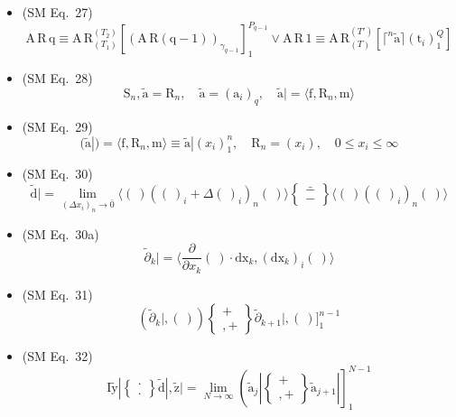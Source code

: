 \documentclass[12pt]{article}
\begin{document}
\begin{itemize}[label={},leftmargin=0pt]
    \item (SM Eq.\ 27) 
    \[
    \mathrm{A}\,\mathrm{R}\,\mathrm{q} \equiv \mathrm{A}\,\mathrm{R}_{(T_1)}^{(T_2)} \left[ (\mathrm{A}\,\mathrm{R}(\mathrm{q}-1))_{\gamma_{q-1}} \right]_1^{P_{q-1}} \lor \mathrm{A}\,\mathrm{R}\,1 \equiv \mathrm{A}\,\mathrm{R}_{(T)}^{(T')} \left[ \lceil^n \tilde{\mathrm{a}} \rceil (\mathrm{t}_i)_1^Q \right]
    \]

    \item (SM Eq.\ 28) 
    \[
    \mathrm{S}_n, \tilde{\mathrm{a}} = \mathrm{R}_n, \quad \tilde{\mathrm{a}} = (\mathrm{a}_i)_q, \quad \tilde{\mathrm{a}}| = \langle \mathrm{f}, \mathrm{R}_n, \mathrm{m} \rangle
    \]

    \item (SM Eq.\ 29) 
    \[
    (\tilde{\mathrm{a}}|) = \langle \mathrm{f}, \mathrm{R}_n, \mathrm{m} \rangle \equiv \tilde{\mathrm{a}}| (x_i)_1^n, \quad \mathrm{R}_n = (x_i), \quad 0 \le x_i \le \infty
    \]

    \item (SM Eq.\ 30) 
    \[
    \tilde{\mathrm{d}}| = \lim_{(\Delta x_i)_n \to \bar{0}} \langle (\ ) \left( (\ )_i + \Delta (\ )_i \right)_n (\ ) \rangle \left\{ \begin{smallmatrix} \bar{-} \\ - \end{smallmatrix} \right\} \langle (\ ) \left( (\ )_i \right)_n (\ ) \rangle
    \]

    \item (SM Eq.\ 30a) 
    \[
    \tilde{\partial}_k| = \langle \frac{\partial}{\partial x_k} (\ ) \cdot \mathrm{dx}_k, (\mathrm{dx}_k)_i (\ ) \rangle
    \]

    \item (SM Eq.\ 31) 
    \[
    \left( \tilde{\partial}_k |, (\ ) \right) \left\{ \begin{smallmatrix} + \\ ,+ \end{smallmatrix} \right\} \tilde{\partial}_{k+1} |, (\ ) \bigr]_1^{n-1}
    \]

    \item (SM Eq.\ 32) 
    \[
    \mathrm{I} \tilde{\mathrm{y}}| \left\{ \begin{smallmatrix} \cdot \\ . \end{smallmatrix} \right\} \tilde{\mathrm{d}}|, \tilde{\mathrm{z}}| = \lim_{N \to \infty} \left( \tilde{\mathrm{a}}_j| \left\{ \begin{smallmatrix} + \\ ,+ \end{smallmatrix} \right\} \tilde{\mathrm{a}}_{j+1}| \right]_1^{N-1}
    \]


\end{itemize}
\end{document}
